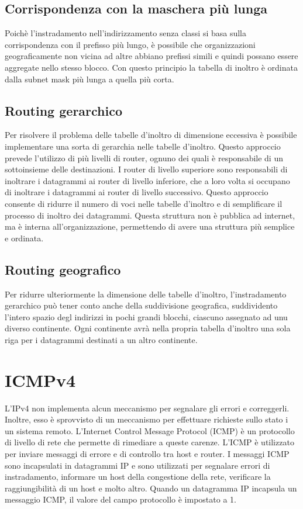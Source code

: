 \documentclass[12pt]{report}
\begin{document}
\subsection{Corrispondenza con la maschera più lunga}
Poichè l'instradamento nell'indirizzamento senza classi si basa sulla corrispondenza con il prefisso più lungo, è possibile che organizzazioni geograficamente non vicina ad altre abbiano prefissi simili e quindi possano essere aggregate nello stesso blocco. Con questo principio la tabella di inoltro è ordinata dalla subnet mask più lunga a quella più corta.

\subsection{Routing gerarchico}
Per risolvere il problema delle tabelle d'inoltro di dimensione eccessiva è possibile implementare una sorta di gerarchia nelle tabelle d'inoltro. Questo approccio prevede l'utilizzo di più livelli di router, ognuno dei quali è responsabile di un sottoinsieme delle destinazioni. I router di livello superiore sono responsabili di inoltrare i datagrammi ai router di livello inferiore, che a loro volta si occupano di inoltrare i datagrammi ai router di livello successivo. Questo approccio consente di ridurre il numero di voci nelle tabelle d'inoltro e di semplificare il processo di inoltro dei datagrammi. Questa struttura non è pubblica ad internet, ma è interna all'organizzazione, permettendo di avere una struttura più semplice e ordinata.

\subsection{Routing geografico}
Per ridurre ulteriormente la dimensione delle tabelle d'inoltro, l'instradamento gerarchico può tener conto anche della suddivisione geografica, suddividento l'intero spazio degl indirizzi in pochi grandi blocchi, ciascuno assegnato ad unu diverso continente. Ogni continente avrà nella propria tabella d'inoltro una sola riga per i datagrammi destinati a un altro continente.

\section{ICMPv4}
L'IPv4 non implementa alcun meccanismo per segnalare gli errori e correggerli. Inoltre, esso è sprovvisto di un meccanismo per effettuare richieste sullo stato i un sistema remoto. L'Internet Control Message Protocol (ICMP) è un protocollo di livello di rete che permette di rimediare a queste carenze. L'ICMP è utilizzato per inviare messaggi di errore e di controllo tra host e router. I messaggi ICMP sono incapsulati in datagrammi IP e sono utilizzati per segnalare errori di instradamento, informare un host della congestione della rete, verificare la raggiungibilità di un host e molto altro. Quando un datagramma IP incapsula un messaggio ICMP, il valore del campo protocollo è impostato a 1.
\end{document}
